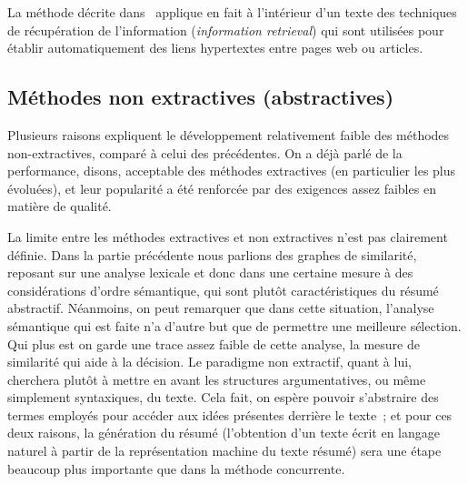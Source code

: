 \documentclass[a4paper, 12pt]{article}
\begin{document}
La méthode décrite dans~\cite{salton_automatic_1997} applique en fait à l'intérieur d'un texte des techniques de récupération  de l'information (\emph{information retrieval}) qui sont utilisées pour établir automatiquement des liens hypertextes entre pages web ou articles.


\subsection{Méthodes non extractives (abstractives)}

Plusieurs raisons expliquent le développement relativement faible des méthodes non-extractives, comparé à celui des précédentes. On a déjà parlé de la performance, disons, acceptable des méthodes extractives (en particulier les plus évoluées), et leur popularité a été renforcée par des exigences assez faibles en matière de qualité. %

La limite entre les méthodes extractives et non extractives n'est pas clairement définie. Dans la partie précédente nous parlions des graphes de similarité, reposant sur une analyse lexicale et donc dans une certaine mesure à des considérations d'ordre sémantique, qui sont plutôt caractéristiques du résumé abstractif. Néanmoins, on peut remarquer que dans cette situation, l'analyse sémantique qui est faite n'a d'autre but que de permettre une meilleure sélection. Qui plus est on garde une trace assez faible de cette analyse, la mesure de similarité qui aide à la décision. Le paradigme non extractif, quant à lui, cherchera plutôt à mettre en avant les structures argumentatives, ou même simplement syntaxiques, du texte. Cela fait, on espère pouvoir s'abstraire des termes employés pour accéder aux idées présentes derrière le texte~; et pour ces deux raisons, la génération du résumé (l'obtention d'un texte écrit en langage naturel à partir de la représentation machine du texte résumé) sera une étape beaucoup plus importante que dans la méthode concurrente.\\
\end{document}
